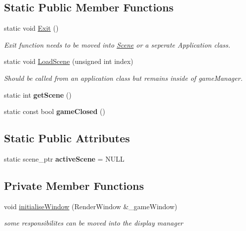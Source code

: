 \subsection*{Static Public Member Functions}
\begin{DoxyCompactItemize}
\item 
\mbox{\label{class_game_manager_acbd9fb84f9e18c8cb585738d5c89a2b9}} 
static void \hyperlink{class_game_manager_acbd9fb84f9e18c8cb585738d5c89a2b9}{Exit} ()
\begin{DoxyCompactList}\small\item\em Exit function needs to be moved into \hyperlink{class_scene}{Scene} or a seperate Application class. \end{DoxyCompactList}\item 
\mbox{\label{class_game_manager_a09b8801bcfdd8d5cbc52e27895b84e3b}} 
static void \hyperlink{class_game_manager_a09b8801bcfdd8d5cbc52e27895b84e3b}{Load\+Scene} (unsigned int index)
\begin{DoxyCompactList}\small\item\em Should be called from an application class but remains inside of game\+Manager. \end{DoxyCompactList}\item 
\mbox{\label{class_game_manager_ac8de938e05092ef365c77ba7a3c2c0d7}} 
static int {\bfseries get\+Scene} ()
\item 
\mbox{\label{class_game_manager_a4eb94c6171bf3292eb57b291e2174289}} 
static const bool {\bfseries game\+Closed} ()
\end{DoxyCompactItemize}
\subsection*{Static Public Attributes}
\begin{DoxyCompactItemize}
\item 
\mbox{\label{class_game_manager_a969dd909c6b70310843d34e2490736b4}} 
static scene\+\_\+ptr {\bfseries active\+Scene} = N\+U\+LL
\end{DoxyCompactItemize}
\subsection*{Private Member Functions}
\begin{DoxyCompactItemize}
\item 
\mbox{\label{class_game_manager_a8344695f2ba7324b00c5da8b79d8b399}} 
void \hyperlink{class_game_manager_a8344695f2ba7324b00c5da8b79d8b399}{initialise\+Window} (Render\+Window \&\+\_\+game\+Window)
\begin{DoxyCompactList}\small\item\em some responsibilites can be moved into the display manager \end{DoxyCompactList}\end{DoxyCompactItemize}
